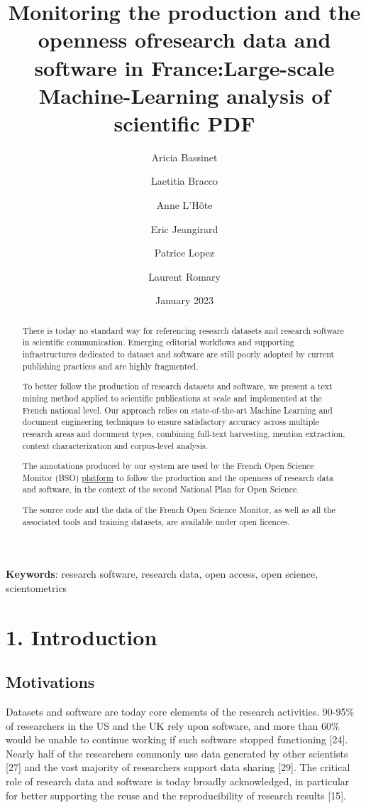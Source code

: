 \documentclass[
]{article}
\title{Monitoring the production and the openness of\newline research
data and software in France:\newline Large-scale Machine-Learning
analysis of scientific PDF}
\author[%
  2%
  ]{%
  Aricia Bassinet%
}
\author[%
  2%
  ]{%
  Laetitia Bracco%
}
\author[%
  1%
  ]{%
  Anne L'Hôte%
}
\author[%
  1%
  ]{%
  Eric Jeangirard%
}
\author[%
  3%
  ]{%
  Patrice Lopez%
}
\author[%
  4%
  ]{%
  Laurent Romary%
}
\affil[1]{French Ministry of Higher Education and Research, Paris,
France}
\affil[2]{University of Lorraine, France}
\affil[3]{science-miner, France}
\affil[4]{Inria, France}
\date{January 2023}
\begin{document}
\maketitle
\begin{abstract}
There is today no standard way for referencing research datasets and
research software in scientific communication. Emerging editorial
workflows and supporting infrastructures dedicated to dataset and
software are still poorly adopted by current publishing practices and
are highly fragmented.

To better follow the production of research datasets and software, we
present a text mining method applied to scientific publications at scale
and implemented at the French national level. Our approach relies on
state-of-the-art Machine Learning and document engineering techniques to
ensure satisfactory accuracy across multiple research areas and document
types, combining full-text harvesting, mention extraction, context
characterization and corpus-level analysis.

The annotations produced by our system are used by the French Open
Science Monitor (BSO)
\href{https://frenchopensciencemonitor.esr.gouv.fr}{platform} to follow
the production and the openness of research data and software, in the
context of the second National Plan for Open Science.

The source code and the data of the French Open Science Monitor, as well
as all the associated tools and training datasets, are available under
open licences.
\end{abstract}

\textbf{Keywords}: research software, research data, open access, open
science, scientometrics

\hypertarget{introduction}{%
\section{1. Introduction}\label{introduction}}

\hypertarget{motivations}{%
\subsection{Motivations}\label{motivations}}

Datasets and software are today core elements of the research
activities. 90-95\% of researchers in the US and the UK rely upon
software, and more than 60\% would be unable to continue working if such
software stopped functioning {[}24{]}. Nearly half of the researchers
commonly use data generated by other scientists {[}27{]} and the vast
majority of researchers support data sharing {[}29{]}. The critical role
of research data and software is today broadly acknowledged, in
particular for better supporting the reuse and the reproducibility of
research results {[}15{]}.
\end{document}
